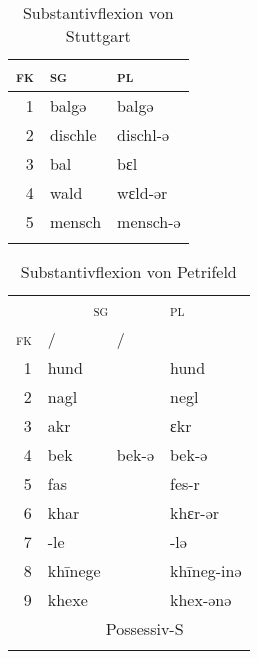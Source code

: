 \begin{table}[H]
	\caption{Substantivflexion von Stuttgart \citep[149-152]{Frey1975}}\label{table14}
	\begin{tabular}{rll}
		\lsptoprule
		\textsc{fk} & \textsc{sg} & \textsc{pl}\\\midrule
		1 & balgǝ & balgǝ\\
		2 & dischle & dischl-ǝ\\
		3 & bal & bɛl\\
		4 & wald & wɛld-ǝr\\
		5 & mensch & mensch-ǝ\\
		\lspbottomrule
	\end{tabular}
\end{table}


\begin{table}[H]
	\caption{Substantivflexion von Petrifeld \citep[59-62]{Moser1937}}\label{table15}
	\begin{tabular}{rlll}
		\lsptoprule
		& \multicolumn{2}{c}{\textsc{sg}} & \textsc{pl}\\\cmidrule(lr){2-3}
		\textsc{fk} & \NOM\slash\AKK & \DAT\slash\GEN & \\\midrule
		1 & hund & & hund\\
		2 & nagl & & negl\\
		3 & akr & & ɛkr\\
		4 & bek & bek-ǝ & bek-ǝ\\
		5 & fas & & fes-r\\
		6 & khar & & khɛr-ǝr\\
		7 & {}-le & & -lǝ\\
		8 & kh\=inege & &kh\=ineg-inǝ\\
		9 & khexe & & khex-ǝnǝ\\
		& \multicolumn{3}{c}{Possessiv-S} \\
		\lspbottomrule
	\end{tabular}
\end{table}



